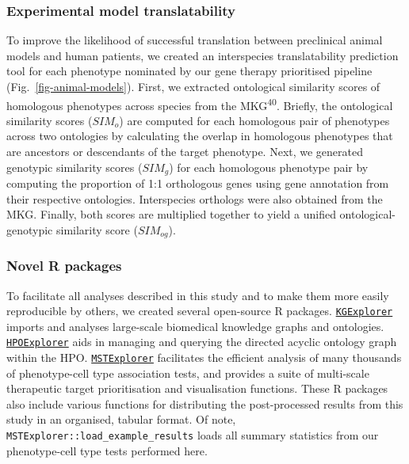 \documentclass[
]{article}
\begin{document}
\subsubsection{Experimental model
translatability}\label{experimental-model-translatability-1}

To improve the likelihood of successful translation between preclinical
animal models and human patients, we created an interspecies
translatability prediction tool for each phenotype nominated by our gene
therapy prioritised pipeline (Fig.~\ref{fig-animal-models}). First, we
extracted ontological similarity scores of homologous phenotypes across
species from the MKG\textsuperscript{40}. Briefly, the ontological
similarity scores (\(SIM_o\)) are computed for each homologous pair of
phenotypes across two ontologies by calculating the overlap in
homologous phenotypes that are ancestors or descendants of the target
phenotype. Next, we generated genotypic similarity scores (\(SIM_g\))
for each homologous phenotype pair by computing the proportion of 1:1
orthologous genes using gene annotation from their respective
ontologies. Interspecies orthologs were also obtained from the MKG.
Finally, both scores are multiplied together to yield a unified
ontological-genotypic similarity score (\(SIM_{og}\)).

\subsubsection{Novel R packages}\label{novel-r-packages}

To facilitate all analyses described in this study and to make them more
easily reproducible by others, we created several open-source R
packages.
\href{https://github.com/neurogenomics/KGExplorer}{\texttt{KGExplorer}}
imports and analyses large-scale biomedical knowledge graphs and
ontologies.
\href{https://github.com/neurogenomics/HPOExplorer}{\texttt{HPOExplorer}}
aids in managing and querying the directed acyclic ontology graph within
the HPO.
\href{https://github.com/neurogenomics/MSTExplorer}{\texttt{MSTExplorer}}
facilitates the efficient analysis of many thousands of phenotype-cell
type association tests, and provides a suite of multi-scale therapeutic
target prioritisation and visualisation functions. These R packages also
include various functions for distributing the post-processed results
from this study in an organised, tabular format. Of note,
\texttt{MSTExplorer::load\_example\_results} loads all summary
statistics from our phenotype-cell type tests performed here.
\end{document}

